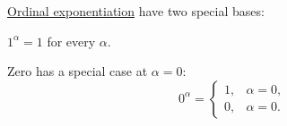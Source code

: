 \begin{proposition}\label{thm:ordinal_exponentiation_fixed_points}
  \hyperref[def:ordinal_exponentiation]{Ordinal exponentiation} have two special bases:
  \begin{thmenum}
     \( 1^\alpha = 1 \) for every \( \alpha \).

     Zero has a special case at \( \alpha = 0 \):
    \begin{equation*}
      0^\alpha = \begin{cases}
        1, &\alpha = 0, \\
        0, &\alpha = 0.
      \end{cases}
    \end{equation*}
  \end{thmenum}
\end{proposition}
